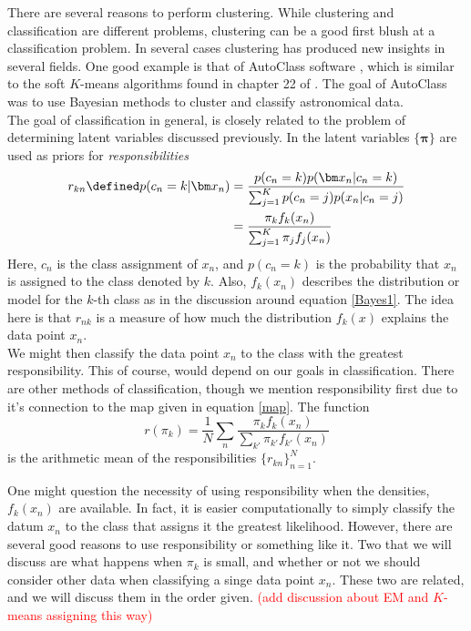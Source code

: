 There are several reasons to perform clustering.  While clustering and classification are different problems, clustering can be a good first blush at a classification problem. In several cases clustering has produced new insights in several fields. One good example is that of AutoClass software \citep{AutoClass1}, which is similar to the soft $K$-means algorithms found in chapter 22 of \cite{MacKay2002}.  The goal of AutoClass was to use Bayesian methods to cluster and classify astronomical data.  \\

The goal of classification in general, is closely related to the problem of determining latent variables discussed previously. In \citep{MacKay2002,BishopBook} the latent variables $\{\bm\pi\}$ are used as priors for \textit{responsibilities}
\begin{align}\label{responsible}
r_{kn}\defined p(c_n=k|\bm x_n)&=\dfrac{p(c_n=k)p(\bm x_n|c_n=k)}{\sum_{j=1}^{K}p(c_n=j)p(x_n|c_n=j)} \nonumber \\
 							   &=\dfrac{\pi_k f_k(x_n)}{\sum_{j=1}^{K}\pi_j f_j(x_n)}
\end{align}
Here, $c_n$ is the class assignment of $x_n$, and $p(c_n=k)$ is the probability that $x_n$ is assigned to the class denoted by $k$. Also, $f_k(x_n)$ describes the distribution or model for the $k$-th class as in the discussion around equation \ref{Bayes1}. The idea here is that $r_{nk}$ is a measure of how much the distribution $f_k(x)$ explains the data point $x_n$.\\

 We might then classify the data point $x_n$ to the class with the greatest responsibility.  This of course, would depend on our goals in classification.
There are other methods of classification, though we mention responsibility first due to it's connection to the map given in equation \ref{map}.  The function
\[r(\pi_k)=\frac 1N\sum_n \frac{\pi_k f_k(x_n)}{\sum_{k'}\pi_{k'}f_{k'}(x_n)}\]
is the arithmetic mean of the responsibilities $\{r_{kn}\}_{n=1}^{N}$.

One might question the necessity of using responsibility when the densities, $f_k(x_n)$ are available.  In fact, it is easier computationally to simply classify the datum $x_n$ to the class that assigns it the greatest likelihood.  However, there are several good reasons to use responsibility or something like it.  Two that we will discuss are what happens when $\pi_k$ is small, and whether or not we should consider other data when classifying a singe data point $x_n$.  These two are related, and we will discuss them in the order given. \textcolor{red}{(add discussion about EM and $K$-means assigning this way)}\\

